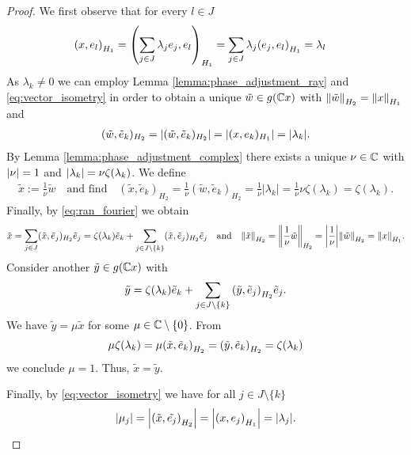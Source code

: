 \begin{proof}
	We first observe that for every $l \in J$ 
	\begin{align}
		\pbraces{x, e_l}_{H_1} &= \pbraces{\sum_{j \in J} \lambda_j e_j, e_l}_{H_1} = \sum_{j \in J} \lambda_j \pbraces{e_j, e_l}_{H_1} = \lambda_l \label{eq:aux_fouriercoef}
	\end{align}
	As $\lambda_k \neq 0$ we can employ Lemma \ref{lemma:phase_adjustment_ray} and \eqref{eq:vector_isometry} in order to obtain a unique $\tilde{w} \in g(\C x)$ with $\norm[H_2]{\tilde{w}} = \norm[H_1]{x}$ and 
	\begin{align*}
		(\tilde{w}, \tilde{e}_k)_{H_2} = |(\tilde{w}, \tilde{e}_k)_{H_2}| = |(x, e_k)_{H_1}| = \vbraces{\lambda_k}.
	\end{align*}
	By Lemma \ref{lemma:phase_adjustment_complex} there exists a unique $\nu \in \C$ with $\vbraces{\nu} = 1$ and $\vbraces{\lambda_k} = \nu \zeta\pbraces{\lambda_k}$. We define
	\begin{align*}
		\tilde{x} := \frac{1}{\nu} \tilde{w} \quad \text{and find} \quad (\tilde{x}, \tilde{e}_k)_{H_2} = \frac{1}{\nu} (\tilde{w}, \tilde{e}_k)_{H_2} = \frac{1}{\nu} |\lambda_k| = \frac{1}{\nu} \nu \zeta(\lambda_k) = \zeta(\lambda_k).
	\end{align*} 
	Finally, by \eqref{eq:ran_fourier} we obtain
	\begin{align*}
		\tilde{x} = \sum_{j \in J} (\tilde{x}, \tilde{e}_j)_{H_2} \tilde{e}_j = \zeta(\lambda_k) \tilde{e}_k + \sum_{j \in J \setminus \{k\}} (\tilde{x}, \tilde{e}_j)_{H_2} \tilde{e}_j \quad \text{and} \quad \norm[H_2]{\tilde{x}} = \norm[H_2]{\frac{1}{\nu}\tilde{w}} = \vbraces{\frac{1}{\nu}} \norm[H_2]{\tilde{w}} = \norm[H_1]{x}. 
	\end{align*}
	Consider another $\tilde{y} \in g\pbraces{\C x}$ with
	\begin{align*}
		\tilde{y} = \zeta(\lambda_k) \tilde{e}_k + \sum_{j \in J \setminus \{k\}} \pbraces{\tilde{y}, \tilde{e}_j}_{H_2} \tilde{e}_j.
	\end{align*}
	We have $\tilde{y} = \mu \tilde{x}$ for some $\mu \in \C \setminus \{0\}$. From 
	\begin{align*}
		\mu \zeta\pbraces{\lambda_k} = \mu \pbraces{\tilde{x}, \tilde{e}_k}_{H_2} = \pbraces{\tilde{y}, \tilde{e}_k}_{H_2} = \zeta\pbraces{\lambda_k}
	\end{align*}
	we conclude $\mu = 1$. Thus, $\tilde{x} = \tilde{y}$. 
	
	Finally, by \eqref{eq:vector_isometry} we have for all $j \in J \setminus \{k\}$
	\begin{align*}
		\vbraces{\mu_j} = \vbraces{\pbraces{\tilde{x}, \tilde{e_j}}_{H_2}} = \vbraces{\pbraces{x, e_j}_{H_1}} = \vbraces{\lambda_j}.
	\end{align*}
\end{proof}


